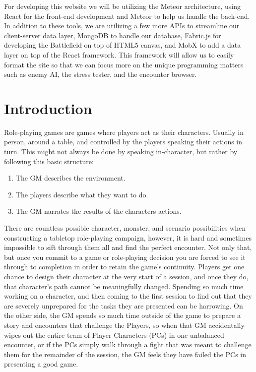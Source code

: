\documentclass[12pt,a4paper]{report}
\begin{document}
For developing this website we will be utilizing the Meteor architecture, using React for the front-end development and Meteor to help us handle the back-end. In addition to these tools, we are utilizing a few more APIs to streamline our client-server data layer, MongoDB to handle our database, Fabric.js for developing the Battlefield on top of HTML5 canvas, and MobX to add a data layer on top of the React framework. This framework will allow us to easily format the site so that we can focus more on the unique programming matters such as enemy AI, the stress tester, and the encounter browser.

\newpage
\chapter*{Introduction}

Role-playing games are games where players act as their characters. Usually in person, around a table, and controlled by the players speaking their actions in turn. This might not always be done by speaking in-character, but rather by following this basic structure:

\begin{enumerate}
	\item The GM describes the environment.
	\item The players describe what they want to do.
	\item The GM narrates the results of the characters actions.
\end{enumerate}

There are countless possible character, monster, and scenario possibilities when constructing a tabletop role-playing campaign, however, it is hard and sometimes impossible to sift through them all and find the perfect encounter. Not only that,  but once you commit to a game or role-playing decision you are forced to see it through to completion in order to retain the game's continuity. Players get one chance to design their character at the very start of a session, and once they do, that character's path cannot be meaningfully changed. Spending so much time working on a character, and then coming to the first session to find out that they are severely unprepared for the tasks they are presented can be harrowing. On the other side, the GM spends so much time outside of the game to prepare a story and encounters that challenge the Players, so when that GM accidentally wipes out the entire team of Player Characters (PCs) in one unbalanced encounter, or if the PCs simply walk through a fight that was meant to challenge them for the remainder of the session, the GM feels they have failed the PCs in presenting a good game.
\newpage
\end{document}
